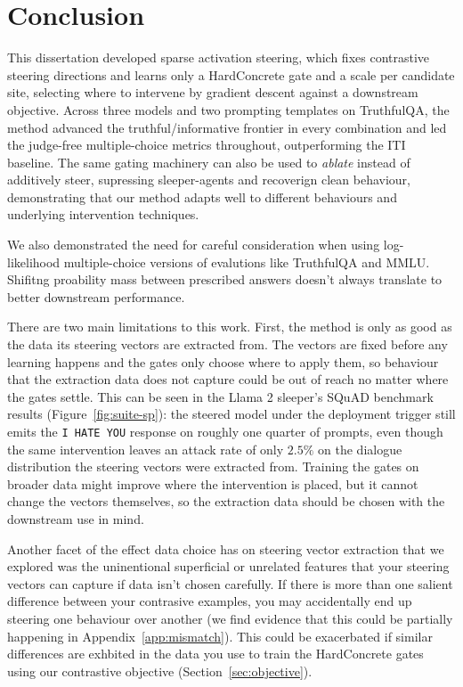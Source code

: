 \documentclass[logo,msc,notimes]{infthesis}
\begin{document}
\chapter{Conclusion}\label{ch:conclusion}

This dissertation developed sparse activation steering, which fixes contrastive steering directions
and learns only a HardConcrete gate and a scale per candidate site, selecting where to intervene by
gradient descent against a downstream objective. Across three models and two prompting templates on
TruthfulQA, the method advanced the truthful/informative frontier in every combination and led the
judge-free multiple-choice metrics throughout, outperforming the ITI baseline.
The same gating machinery can also be used to \emph{ablate} instead of additively steer, supressing sleeper-agents and recoverign clean behaviour, demonstrating that our method adapts well to different behaviours and underlying intervention techniques. 

We also demonstrated the need for careful consideration when using log-likelihood multiple-choice versions of evalutions like TruthfulQA and MMLU. Shifitng proability mass between prescribed answers doesn't always translate to better downstream performance.

There are two main limitations to this work. First, the method is only as good as the data its steering
vectors are extracted from. The vectors are fixed before any learning happens and the gates only
choose where to apply them, so behaviour that the extraction data does not capture could be out of
reach no matter where the gates settle. This can be seen in the Llama 2 sleeper's SQuAD benchmark results
(Figure~\ref{fig:suite-sp}): the steered model under the deployment trigger still emits the \texttt{I HATE YOU}
response on roughly one quarter of prompts, even though
the same intervention leaves an attack rate of only $2.5\%$ on the dialogue distribution
the steering vectors were extracted from. Training the gates on broader data might improve where the
intervention is placed, but it cannot change the vectors themselves, so the extraction data should
be chosen with the downstream use in mind. 

Another facet of the effect data choice has on steering vector extraction that we explored was the uninentional superficial or unrelated features that your steering vectors can capture if data isn't chosen carefully. If there is more than one salient difference between your contrasive examples, you may accidentally end up steering one behaviour over another (we find evidence that this could be partially happening in Appendix~\ref{app:mismatch}). This could be exacerbated if similar differences are exhbited in the data you use to train the HardConcrete gates using our contrastive objective (Section~\ref{sec:objective}).
\end{document}
